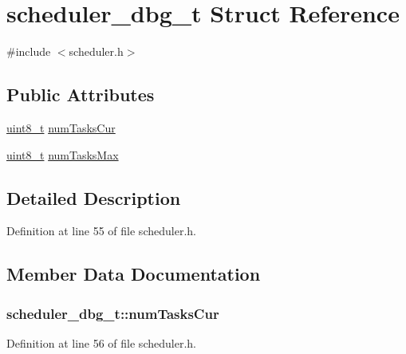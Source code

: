 \hypertarget{structscheduler__dbg__t}{}\section{scheduler\+\_\+dbg\+\_\+t Struct Reference}
\label{structscheduler__dbg__t}


{\ttfamily \#include $<$scheduler.\+h$>$}

\subsection*{Public Attributes}
\begin{DoxyCompactItemize}
\item 
\hyperlink{_p_e___types_8h_aba7bc1797add20fe3efdf37ced1182c5}{uint8\+\_\+t} \hyperlink{structscheduler__dbg__t_a322834fa74e60b5b2f7e74df8deeae8c}{num\+Tasks\+Cur}
\item 
\hyperlink{_p_e___types_8h_aba7bc1797add20fe3efdf37ced1182c5}{uint8\+\_\+t} \hyperlink{structscheduler__dbg__t_a0f0d97e97b02be4a75e328d4d9bdeb45}{num\+Tasks\+Max}
\end{DoxyCompactItemize}


\subsection{Detailed Description}


Definition at line 55 of file scheduler.\+h.



\subsection{Member Data Documentation}
\subsubsection[{\texorpdfstring{num\+Tasks\+Cur}{numTasksCur}}]{ scheduler\+\_\+dbg\+\_\+t\+::num\+Tasks\+Cur}\hypertarget{structscheduler__dbg__t_a322834fa74e60b5b2f7e74df8deeae8c}{}\label{structscheduler__dbg__t_a322834fa74e60b5b2f7e74df8deeae8c}


Definition at line 56 of file scheduler.\+h.

